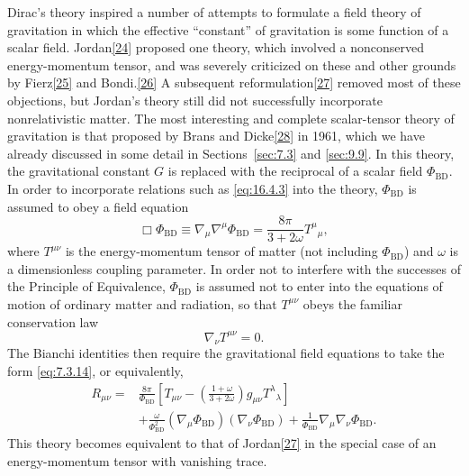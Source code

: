 Dirac's theory inspired a number of attempts to formulate a field theory of
gravitation in which the effective ``constant'' of gravitation is some function
of a scalar field. Jordan\hyperref[ch16-ref-24]{[24]} proposed one theory,
which involved a nonconserved energy-momentum tensor, and was severely
criticized on these and other grounds by Fierz\hyperref[ch16-ref-25]{[25]} and
Bondi.\hyperref[ch16-ref-26]{[26]} A subsequent
reformulation\hyperref[ch16-ref-27]{[27]} removed most of these objections, but
Jordan's theory still did not successfully incorporate nonrelativistic matter.
The most interesting and complete scalar-tensor theory of gravitation is that
proposed by Brans and Dicke\hyperref[ch16-ref-28]{[28]} in 1961, which we have
already discussed in some detail in Sections~\ref{sec:7.3} and \ref{sec:9.9}.
In this theory, the gravitational constant \(G\) is replaced with the reciprocal
of a scalar field \(\Phi_{\mathrm{BD}}\). In order to incorporate relations such
as \eqref{eq:16.4.3} into the theory, \(\Phi_{\mathrm{BD}}\) is assumed to obey
a field equation
\begin{equation}
  \Box\Phi_{\mathrm{BD}}
  \equiv
  \nabla_\mu\nabla^\mu\Phi_{\mathrm{BD}}
  =
  \frac{8\pi}{3+2\omega}T^\mu{}_\mu,
  \tag{16.4.10}\label{eq:16.4.10}
\end{equation}
where \(T^{\mu\nu}\) is the energy-momentum tensor of matter (not including
\(\Phi_{\mathrm{BD}}\)) and \(\omega\) is a dimensionless coupling parameter.
In order not to interfere with the successes of the Principle of Equivalence,
\(\Phi_{\mathrm{BD}}\) is assumed not to enter into the equations of motion of
ordinary matter and radiation, so that \(T^{\mu\nu}\) obeys the familiar
conservation law
\begin{equation}
  \nabla_\nu T^{\mu\nu}=0.
  \tag{16.4.11}\label{eq:16.4.11}
\end{equation}
The Bianchi identities then require the gravitational field equations to take
the form \eqref{eq:7.3.14}, or equivalently,
\begin{equation}
  \begin{split}
  R_{\mu\nu}
  ={}&
  \frac{8\pi}{\Phi_{\mathrm{BD}}}
  \left[
    T_{\mu\nu}
    -\left(\frac{1+\omega}{3+2\omega}\right)
     g_{\mu\nu}T^\lambda{}_\lambda
  \right]\\
  &+
  \frac{\omega}{\Phi_{\mathrm{BD}}^2}
  (\nabla_\mu\Phi_{\mathrm{BD}})
  (\nabla_\nu\Phi_{\mathrm{BD}})
  +
  \frac1{\Phi_{\mathrm{BD}}}
  \nabla_\mu\nabla_\nu\Phi_{\mathrm{BD}}.
  \end{split}
  \tag{16.4.12}\label{eq:16.4.12}
\end{equation}
This theory becomes equivalent to that of
Jordan\hyperref[ch16-ref-27]{[27]} in the special case of an energy-momentum
tensor with vanishing trace.

